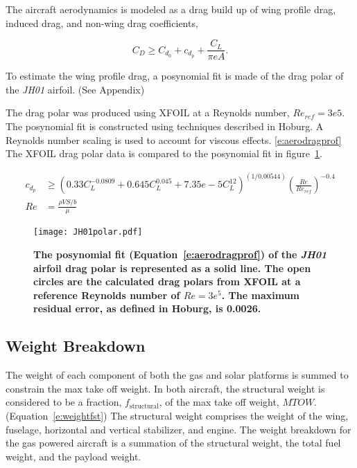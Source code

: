 \documentclass[]{aiaa-tc}%
\begin{document}
The aircraft aerodynamics is modeled as a drag build up of wing profile drag, induced drag, and non-wing drag coefficients, 

\begin{equation}
    \label{e:aerodragb}
    C_D \geq C_{d_0} + c_{d_p} + \frac{C_L}{\pi e A}.
    \end{equation}

    To estimate the wing profile drag, a posynomial fit is made of the drag polar of the \emph{JH01} airfoil. (See Appendix) 
    
    The drag polar was produced using XFOIL at a Reynolds number, $Re_{ref}=3e5$. 
    The posynomial fit is constructed using techniques described in Hoburg.\cite{fitting}
    A Reynolds number scaling is used to account for viscous effects.  \eqref{e:aerodragprof}
    The XFOIL drag polar data is compared to the posynomial fit in figure~\ref{f:JH01polar}.

    \begin{align}
        \label{e:aerodragprof}
        c_{d_p} &\geq (0.33C_L^{-0.0809} + 0.645C_L^{0.045} + 7.35e-5C_L^{12})^{(1/0.00544)} \left( \frac{Re}{Re_{ref}} \right)^{-0.4} \\
        Re &= \frac{\rho V S/b}{\mu}
    \end{align}

\begin{figure}[H]
	\begin{center}
	\texttt{[image: JH01polar.pdf]}
    \caption{ \textbf{ The posynomial fit (Equation~\ref{e:aerodragprof}) of the \emph{JH01} airfoil drag polar is represented as a solid line.  The open circles are the calculated drag polars from XFOIL at a reference Reynolds number of $Re=3e^5$. The maximum residual error, as defined in Hoburg\cite{fitting}, is 0.0026.} }
	\label{f:JH01polar}
	\end{center}
\end{figure}

\subsection{Weight Breakdown}

The weight of each component of both the gas and solar platforms is summed to constrain the max take off weight.  In both aircraft, the structural weight is considered to be a fraction, $f_{\text{structural}}$, of the max take off weight, $MTOW$. (Equation~\ref{e:weightfst}) The structural weight comprises the weight of the wing, fuselage, horizontal and vertical stabilizer, and engine. The weight breakdown for the gas powered aircraft is a summation of the structural weight, the total fuel weight, and the payload weight. 
\end{document}
